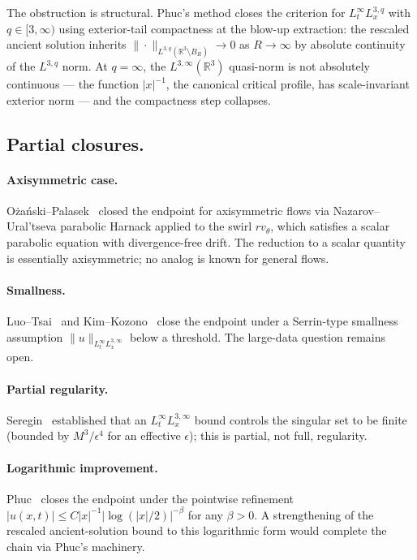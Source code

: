 \documentclass[11pt]{amsart}
\theoremstyle{definition}
\newcommand{\RR}{\mathbb{R}}
\newcommand{\Lweak}[1]{L^{3,\infty}(\RR^{#1})}
\newcommand{\norm}[1]{\|#1\|}
\newcommand{\abs}[1]{|#1|}
\begin{document}
The obstruction is structural. Phuc's method closes the
criterion for $L^\infty_t L^{3,q}_x$ with $q \in [3, \infty)$
using exterior-tail compactness at the blow-up extraction: the
rescaled ancient solution inherits $\norm{\cdot}_{L^{3,q}
(\RR^3 \setminus B_R)} \to 0$ as $R \to \infty$ by absolute
continuity of the $L^{3,q}$ norm. At $q = \infty$, the
$\Lweak{3}$ quasi-norm is not absolutely continuous --- the
function $\abs{x}^{-1}$, the canonical critical profile, has
scale-invariant exterior norm --- and the compactness step
collapses.

\subsection{Partial closures.}

\paragraph{Axisymmetric case.}
O\.{z}a\'nski--Palasek~\cite{OzanskiPalasek} closed the endpoint
for axisymmetric flows via Nazarov--Ural'tseva parabolic Harnack
\cite{NazarovUraltseva} applied to the swirl $rv_\theta$, which
satisfies a scalar parabolic equation with divergence-free drift.
The reduction to a scalar quantity is essentially axisymmetric;
no analog is known for general flows.

\paragraph{Smallness.}
Luo--Tsai~\cite{LuoTsai} and Kim--Kozono~\cite{KimKozono} close
the endpoint under a Serrin-type smallness assumption
$\norm{u}_{L^\infty_t L^{3,\infty}_x}$ below a threshold. The
large-data question remains open.

\paragraph{Partial regularity.}
Seregin~\cite{Seregin2019} established that an
$L^\infty_t L^{3,\infty}_x$ bound controls the singular set to be
finite (bounded by $M^3/\epsilon^4$ for an effective $\epsilon$);
this is partial, not full, regularity.

\paragraph{Logarithmic improvement.}
Phuc~\cite[Thm~1.5]{Phuc2015} closes the endpoint under the
pointwise refinement
$\abs{u(x, t)} \leq C\abs{x}^{-1}\abs{\log(\abs{x}/2)}^{-\beta}$
for any $\beta > 0$. A strengthening of the rescaled
ancient-solution bound to this logarithmic form would complete
the chain via Phuc's machinery.
\end{document}
